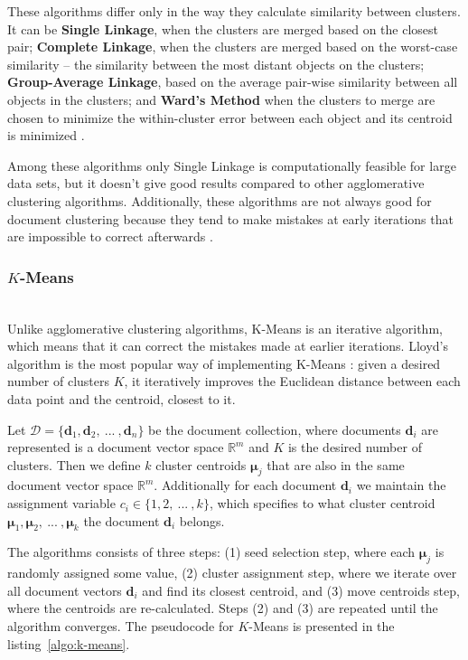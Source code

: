These algorithms differ only in the way they calculate similarity between 
clusters. It can be \textbf{Single Linkage}, when the clusters are merged based
on the closest pair; \textbf{Complete Linkage}, when the clusters are merged
based on the worst-case similarity -- the similarity between the most
distant objects on the clusters; \textbf{Group-Average Linkage}, based 
on the average pair-wise similarity between all objects in the clusters;
and \textbf{Ward's Method} when the clusters to merge are chosen to 
minimize the within-cluster error between each object and its centroid
is minimized \cite{oikonomakou2005review}.

Among these algorithms only Single Linkage is computationally feasible
for large data sets, but it doesn't give good results compared to other
agglomerative clustering algorithms. Additionally, these algorithms
are not always good for document clustering because they tend to
make mistakes at early iterations that are impossible to correct
afterwards \cite{steinbach2000comparison}.



\subsubsection{$K$-Means} \label{sec:kmeans} \ \\

Unlike agglomerative clustering algorithms, K-Means is an iterative
algorithm, which means that it can correct the mistakes made
at earlier iterations. Lloyd's algorithm is the most popular way 
of implementing K-Means \cite{xu2005survey}: given a desired number of clusters $K$,
it iteratively improves the Euclidean distance between each data
point and the centroid, closest to it.


Let $\mathcal D = \{  \mathbf d_1, \mathbf d_2, \ ... \ , \mathbf d_n \}$
be the document collection, where documents $\mathbf d_i$ are represented
is a document vector space $\mathbb R^m$ and $K$ is the desired
number of clusters. Then we define $k$ cluster centroids $\boldsymbol \mu_j$ that are
also in the same document vector space $\mathbb R^m$.
Additionally for each document $\mathbf d_i$ we maintain the assignment
variable $c_i \in \{ 1, 2, \ ... \ , k \}$, which specifies to what
cluster centroid $\boldsymbol \mu_1, \boldsymbol \mu_2, \ ... \ , \boldsymbol \mu_k$
the document $\mathbf d_i$ belongs.


The algorithms consists of three steps: (1) seed selection step,
where each $\boldsymbol \mu_j$ is randomly assigned some value,
(2) cluster assignment step, where we iterate over all document vectors
$\mathbf d_i$ and find its closest centroid, and (3)  move centroids step,
where the centroids are re-calculated. Steps (2) and (3) are repeated
until the algorithm converges. The pseudocode for $K$-Means is presented
in the listing~\ref{algo:k-means}.

